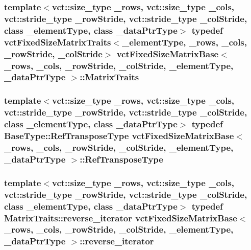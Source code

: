 \hypertarget{classvct_fixed_size_matrix_base_a6691e8d4aab2e2d733c494357ffd870a}{
\subsubsection[{Matrix\-Traits}]{\setlength{\rightskip}{0pt plus 5cm}template$<$vct\-::size\-\_\-type \-\_\-rows, vct\-::size\-\_\-type \-\_\-cols, vct\-::stride\-\_\-type \-\_\-row\-Stride, vct\-::stride\-\_\-type \-\_\-col\-Stride, class \-\_\-element\-Type, class \-\_\-data\-Ptr\-Type$>$ typedef {\bf vct\-Fixed\-Size\-Matrix\-Traits}$<$\-\_\-element\-Type, \-\_\-rows, \-\_\-cols, \-\_\-row\-Stride, \-\_\-col\-Stride$>$ {\bf vct\-Fixed\-Size\-Matrix\-Base}$<$ \-\_\-rows, \-\_\-cols, \-\_\-row\-Stride, \-\_\-col\-Stride, \-\_\-element\-Type, \-\_\-data\-Ptr\-Type $>$\-::{\bf Matrix\-Traits}}}\label{classvct_fixed_size_matrix_base_a6691e8d4aab2e2d733c494357ffd870a}
\hypertarget{classvct_fixed_size_matrix_base_aaddf4b1c77971ed669535edb04d02628}{
\subsubsection[{Ref\-Transpose\-Type}]{\setlength{\rightskip}{0pt plus 5cm}template$<$vct\-::size\-\_\-type \-\_\-rows, vct\-::size\-\_\-type \-\_\-cols, vct\-::stride\-\_\-type \-\_\-row\-Stride, vct\-::stride\-\_\-type \-\_\-col\-Stride, class \-\_\-element\-Type, class \-\_\-data\-Ptr\-Type$>$ typedef {\bf Base\-Type\-::\-Ref\-Transpose\-Type} {\bf vct\-Fixed\-Size\-Matrix\-Base}$<$ \-\_\-rows, \-\_\-cols, \-\_\-row\-Stride, \-\_\-col\-Stride, \-\_\-element\-Type, \-\_\-data\-Ptr\-Type $>$\-::{\bf Ref\-Transpose\-Type}}}\label{classvct_fixed_size_matrix_base_aaddf4b1c77971ed669535edb04d02628}
\hypertarget{classvct_fixed_size_matrix_base_aa437178891b922bbc199cd059d2a79fe}{
\subsubsection[{reverse\-\_\-iterator}]{\setlength{\rightskip}{0pt plus 5cm}template$<$vct\-::size\-\_\-type \-\_\-rows, vct\-::size\-\_\-type \-\_\-cols, vct\-::stride\-\_\-type \-\_\-row\-Stride, vct\-::stride\-\_\-type \-\_\-col\-Stride, class \-\_\-element\-Type, class \-\_\-data\-Ptr\-Type$>$ typedef {\bf Matrix\-Traits\-::reverse\-\_\-iterator} {\bf vct\-Fixed\-Size\-Matrix\-Base}$<$ \-\_\-rows, \-\_\-cols, \-\_\-row\-Stride, \-\_\-col\-Stride, \-\_\-element\-Type, \-\_\-data\-Ptr\-Type $>$\-::{\bf reverse\-\_\-iterator}}}\label{classvct_fixed_size_matrix_base_aa437178891b922bbc199cd059d2a79fe}
